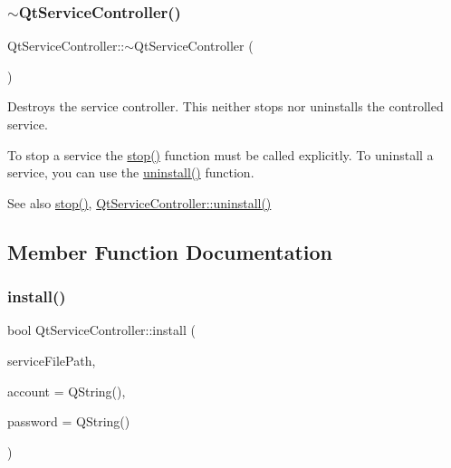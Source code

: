 \subsubsection{\texorpdfstring{$\sim$\+Qt\+Service\+Controller()}{~QtServiceController()}}
{\footnotesize\ttfamily Qt\+Service\+Controller\+::$\sim$\+Qt\+Service\+Controller (\begin{DoxyParamCaption}{ }\end{DoxyParamCaption})\hspace{0.3cm}{\ttfamily [virtual]}}

Destroys the service controller. This neither stops nor uninstalls the controlled service.

To stop a service the \hyperlink{class_qt_service_controller_ad06afa647666769e309474b18bf7cf90}{stop()} function must be called explicitly. To uninstall a service, you can use the \hyperlink{class_qt_service_controller_a25cd2f1f6868ece5de77976eb55cb74c}{uninstall()} function.

\begin{DoxySeeAlso}{See also}
\hyperlink{class_qt_service_controller_ad06afa647666769e309474b18bf7cf90}{stop()}, \hyperlink{class_qt_service_controller_a25cd2f1f6868ece5de77976eb55cb74c}{Qt\+Service\+Controller\+::uninstall()} 
\end{DoxySeeAlso}


\subsection{Member Function Documentation}
\mbox{\label{class_qt_service_controller_a7e2b85e911ff152557dd25959e76094b}} 
\subsubsection{\texorpdfstring{install()}{install()}}
{\footnotesize\ttfamily bool Qt\+Service\+Controller\+::install (\begin{DoxyParamCaption}\item[{const Q\+String \&}]{service\+File\+Path,  }\item[{const Q\+String \&}]{account = {\ttfamily QString()},  }\item[{const Q\+String \&}]{password = {\ttfamily QString()} }\end{DoxyParamCaption})\hspace{0.3cm}{\ttfamily [static]}}

